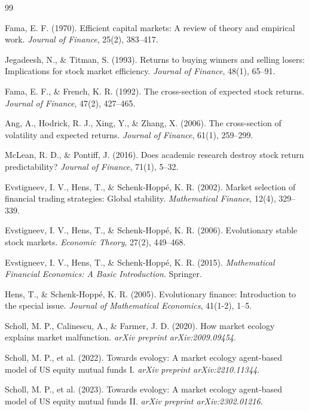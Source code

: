 ﻿\begin{thebibliography}{99}

Fama, E. F. (1970). Efficient capital markets: A review of theory and empirical work. \textit{Journal of Finance}, 25(2), 383--417.

Jegadeesh, N., \& Titman, S. (1993). Returns to buying winners and selling losers: Implications for stock market efficiency. \textit{Journal of Finance}, 48(1), 65--91.

Fama, E. F., \& French, K. R. (1992). The cross-section of expected stock returns. \textit{Journal of Finance}, 47(2), 427--465.

Ang, A., Hodrick, R. J., Xing, Y., \& Zhang, X. (2006). The cross-section of volatility and expected returns. \textit{Journal of Finance}, 61(1), 259--299.

McLean, R. D., \& Pontiff, J. (2016). Does academic research destroy stock return predictability? \textit{Journal of Finance}, 71(1), 5--32.

Evstigneev, I. V., Hens, T., \& Schenk-Hopp\'{e}, K. R. (2002). Market selection of financial trading strategies: Global stability. \textit{Mathematical Finance}, 12(4), 329--339.

Evstigneev, I. V., Hens, T., \& Schenk-Hopp\'{e}, K. R. (2006). Evolutionary stable stock markets. \textit{Economic Theory}, 27(2), 449--468.

Evstigneev, I. V., Hens, T., \& Schenk-Hopp\'{e}, K. R. (2015). \textit{Mathematical Financial Economics: A Basic Introduction}. Springer.

Hens, T., \& Schenk-Hopp\'{e}, K. R. (2005). Evolutionary finance: Introduction to the special issue. \textit{Journal of Mathematical Economics}, 41(1-2), 1--5.

Scholl, M. P., Calinescu, A., \& Farmer, J. D. (2020). How market ecology explains market malfunction. \textit{arXiv preprint arXiv:2009.09454}.

Scholl, M. P., et al. (2022). Towards evology: A market ecology agent-based model of US equity mutual funds I. \textit{arXiv preprint arXiv:2210.11344}.

Scholl, M. P., et al. (2023). Towards evology: A market ecology agent-based model of US equity mutual funds II. \textit{arXiv preprint arXiv:2302.01216}.


\end{thebibliography}
